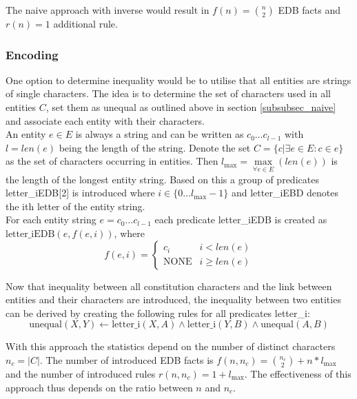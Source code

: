 \documentclass[hyperref,bachelorofscience,fleqn]{cgvpub}
\begin{document}
The naive approach with inverse would result in \(f(n) = \binom{n}{2}\) EDB facts and \(r(n) = 1\) additional rule.

\subsubsection{Encoding}
One option to determine inequality would be to utilise that all entities are strings of single characters. The idea is to determine the set of characters used in all entities \(C\), set them as unequal as outlined above in section \ref{subsubsec_naive} and associate each entity with their characters.\\

An entity \(e \in E\) is always a string and can be written as \(c_0 \ldots c_{l - 1}\) with \(l = len(e)\) being the length of the string. Denote the set \(C = \{c | \exists e \in E: c \in e\}\) as the set of characters occurring in entities. Then \(l_{\max} = \max\limits_{\forall e \in E}(len(e))\) is the length of the longest entity string. Based on this a group of predicates letter\_iEDB[2] is introduced where \(i \in \{0 \ldots l_{\max}-1\}\) and letter\_iEBD denotes the ith letter of the entity string.\\

For each entity string \(e = c_0 \ldots c_{l - 1}\) each predicate letter\_iEDB is created as \(\text{letter\_iEDB}(e, f(e, i))\), where
\begin{equation*}
f(e, i) = 
\begin{cases}
      c_i & i < len(e) \\
      \text{NONE} & i \geq len(e)
\end{cases}
\end{equation*}

Now that inequality between all constitution characters and the link between entities and their characters are introduced, the inequality between two entities can be derived by creating the following rules for all predicates letter\_i:
\begin{equation*}
\text{unequal}(X, Y) \leftarrow \text{letter\_i}(X, A) \wedge \text{letter\_i}(Y, B) \wedge \text{unequal}(A, B)
\end{equation*}

With this approach the statistics depend on the number of distinct characters \(n_c = |C|\). The number of introduced EDB facts is \(f(n, n_c) = \binom{n_c}{2} + n*l_{\max}\) and the number of introduced rules \(r(n, n_c) = 1 + l_{\max}\). The effectiveness of this approach thus depends on the ratio between \(n\) and \(n_c\).
\end{document}
